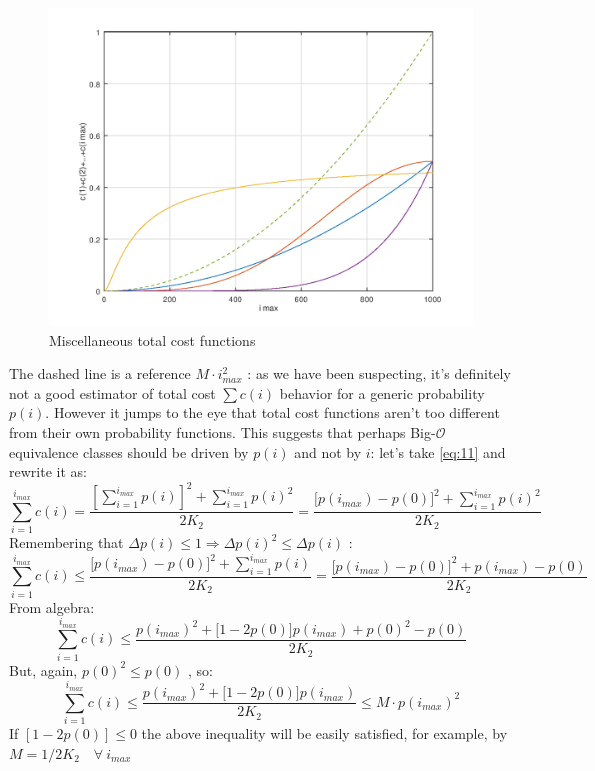 \documentclass[10pt,a4paper]{article}
\begin{document}
	\begin{figure}[H]	
		\centering
		\includegraphics[height=0.33\textheight]{FIG/misctotc.png}
		\caption{Miscellaneous total cost functions}
		\label{fig:misctotc}
	\end{figure}
	The dashed line is a reference $M \cdot i_{max}^{2}$ : as we have been suspecting, it’s definitely not a good estimator of total cost $\sum c(i)$ behavior for a generic probability $p(i)$.
	However it jumps to the eye that total cost functions aren’t too different from their own probability functions. This suggests that perhaps Big-$\mathcal{O}$ equivalence classes should be driven by $p(i)$ and not by $i$: let’s take \ref{eq:11} and rewrite it as:
	\begin{equation*}
		\sum_{i=1}^{i_{max}} c(i) = \frac{\left[ \displaystyle\sum_{i=1}^{i_{max}}p(i) \right]^{2} +  \displaystyle\sum_{i=1}^{i_{max}}p(i)^{2}}{2 K_{2}} = \frac{\big[ p(i_{max})-p(0)\big]^{2} +  \displaystyle\sum_{i=1}^{i_{max}}p(i)^{2}}{2 K_{2}}
	\end{equation*}
	Remembering that $\Delta p(i) \leq 1 \Longrightarrow \Delta p(i)^{2} \leq \Delta p(i)$ :
	\begin{equation*}
		\sum_{i=1}^{i_{max}} c(i) \leq \frac{\big[ p(i_{max})-p(0)\big]^{2} +  \displaystyle\sum_{i=1}^{i_{max}}p(i)}{2 K_{2}} = \frac{\big[ p(i_{max})-p(0)\big]^{2} + p(i_{max})-p(0)}{2 K_{2}}
	\end{equation*}
	From algebra:
	\begin{equation*}
		\sum_{i=1}^{i_{max}} c(i) \leq \frac{p(i_{max})^{2} + \big[1-2p(0)\big] p(i_{max}) +p(0)^{2} - p(0)}{2 K_{2}}
	\end{equation*}
	But, again, $p(0)^{2} \leq p(0)$ , so:
	\begin{equation*}
		\sum_{i=1}^{i_{max}} c(i) \leq \frac{p(i_{max})^{2} + \big[1-2p(0)\big] p(i_{max})}{2 K_{2}} \leq M \cdot p(i_{max})^{2}
	\end{equation*}
	If $[1-2p(0)] \leq 0$ the above inequality will be easily satisfied, for example, by $M=1/2K_{2} \quad \forall \ i_{max}$
	
\end{document}
